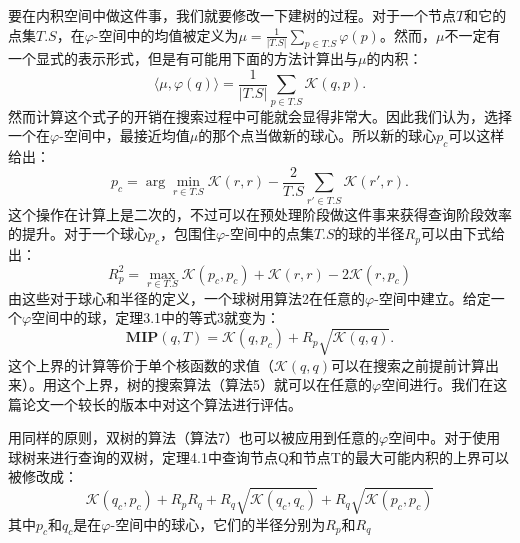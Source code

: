 \documentclass[twocolumn,a4paper]{article}
\begin{document}
要在内积空间中做这件事，我们就要修改一下建树的过程。对于一个节点$T$和它的点集$T.S$，在$\varphi$-空间中的均值被定义为$\mu=\frac{1}{|T.S|}\sum_{p\in T.S}\varphi(p)$。然而，$\mu$不一定有一个显式的表示形式，但是有可能用下面的方法计算出与$\mu$的内积：
\begin{equation*}
\langle\mu,\varphi(q)\rangle = \frac{1}{|T.S|}\sum_{p \in T.S}\mathcal{K}(q,p).
\end{equation*}
然而计算这个式子的开销在搜索过程中可能就会显得非常大。因此我们认为，选择一个在$\varphi$-空间中，最接近均值$\mu$的那个点当做新的球心。所以新的球心$p_c$可以这样给出：
\begin{equation}
p_c = \arg\min_{r\in T.S}\mathcal{K}(r,r) - \frac{2}{T.S}\sum_{r'\in T.S}\mathcal{K}(r',r).
\end{equation}
这个操作在计算上是二次的，不过可以在预处理阶段做这件事来获得查询阶段效率的提升。对于一个球心$p_c$，包围住$\varphi$-空间中的点集$T.S$的球的半径$R_p$可以由下式给出：
\begin{equation}
R_p^2 = \max_{r\in T.S}\mathcal{K}(p_c,p_c)+\mathcal{K}(r,r) - 2\mathcal{K}(r,p_c)
\end{equation}
由这些对于球心和半径的定义，一个球树用算法2在任意的$\varphi$-空间中建立。给定一个$\varphi$空间中的球，定理3.1中的等式3就变为：
\begin{equation}
\mathbf{MIP}(q,T) = \mathcal{K}(q,p_c) + R_p\sqrt{\mathcal{K}(q,q)}.
\end{equation}
这个上界的计算等价于单个核函数的求值（$\mathcal{K}(q,q)$可以在搜索之前提前计算出来）。用这个上界，树的搜索算法（算法5）就可以在任意的$\varphi$空间进行。我们在这篇论文一个较长的版本中对这个算法进行评估。

用同样的原则，双树的算法（算法7）也可以被应用到任意的$\varphi$空间中。对于使用球树来进行查询的双树，定理4.1中查询节点Q和节点T的最大可能内积的上界可以被修改成：
\begin{equation}
\mathcal{K}(q_c, p_c) + R_p R_q + R_q \sqrt{\mathcal{K}(q_c,q_c)} + R_q \sqrt{\mathcal{K}(p_c, p_c)}
\end{equation}
其中$p_c$和$q_c$是在$\varphi$-空间中的球心，它们的半径分别为$R_p$和$R_q$
\end{document}
